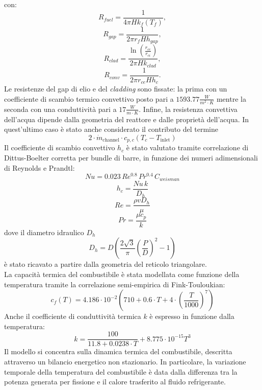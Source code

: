\documentclass[12pt]{report}
\begin{document}
con:
\begin{equation}    
    R_{fuel} = \frac{1}{4 \pi H k_f(T_f)},
\end{equation}
\begin{equation}
    R_{gap} = \frac{1}{2 \pi r_f H h_{gap}},
\end{equation}
\begin{equation}
    R_{clad} = \frac{\ln\left(\frac{r_{ce}}{r_{ci}}\right)}{2 \pi H k_{clad}},
\end{equation}
\begin{equation}
    R_{conv} = \frac{1}{2 \pi r_{ce} H h_c}.
\end{equation}
Le resistenze del gap di elio e del \textit{cladding} sono fissate: la prima con un coefficiente di scambio termico convettivo posto pari a $1593.77 \frac {W}{m^2\cdot K}$ mentre la seconda con una conduttività pari a $17 \frac{W}{m\cdot K}$. Infine, la resistenza convettiva dell'acqua dipende dalla geometria del reattore e dalle proprietà dell'acqua. In quest'ultimo caso è stato anche considerato il contributo del termine
\begin{equation}
    2 \cdot \dot m_\text{channel} \cdot c_{p,c} (T_c-T_\text{inlet})
\end{equation}
Il coefficiente di scambio convettivo $h_c$ è stato valutato tramite correlazione di Dittus-Boelter corretta per bundle di barre, in funzione dei numeri adimensionali di Reynolds e Prandtl:
\begin{equation}
    Nu = 0.023 \, Re^{0.8} \, Pr^{0.4} \, C_{weisman}
\end{equation}
\begin{equation}
    h_c = \frac{Nu \, k}{D_h}
\end{equation}
\begin{equation}
    Re = \frac{\rho v D_h}{\mu}
\end{equation}
\begin{equation}
    Pr = \frac{\mu c_p}{k}
\end{equation}
dove il diametro idraulico $D_h$
\begin{equation}
    D_h = D \left( \frac{2\sqrt{3}}{\pi} \left(\frac{P}{D}\right)^2 - 1 \right)
\end{equation}
è stato ricavato a partire dalla geometria del reticolo triangolare.\\
La capacità termica del combustibile è stata modellata come funzione della temperatura tramite la correlazione semi-empirica di Fink-Touloukian:
\begin{equation}
    c_f(T) = 4.186 \cdot  10^{-2}  (710 + 0.6 \cdot T+ 4 \cdot (\frac{T}{1000})^7)
\end{equation}
Anche il coefficiente di conduttività termica $k$ è espresso in funzione dalla temperatura:
\begin{equation}
    k = \frac{100}{11.8+0.0238 \cdot T}+ 8.775 \cdot 10^{-15}T^3
\end{equation}
Il modello si concentra sulla dinamica termica del combustibile, descritta attraverso un bilancio energetico non stazionario. In particolare, la variazione temporale della temperatura del combustibile è data dalla differenza tra la potenza generata per fissione e il calore trasferito al fluido refrigerante.
\end{document}
